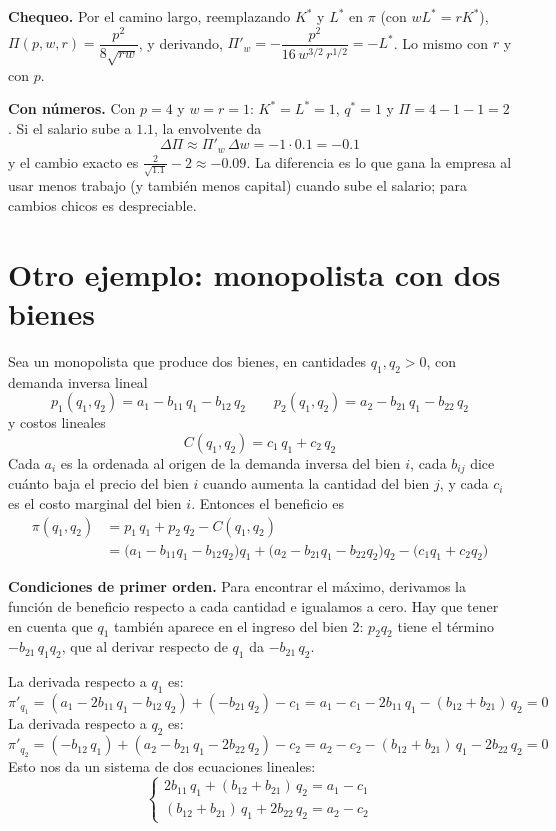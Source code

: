 \documentclass{article}
\begin{document}
\textbf{Chequeo.} Por el camino largo, reemplazando \(K^*\) y \(L^*\) en \(\pi\) (con \(wL^*=rK^*\)), \(\Pi(p,w,r)=\dfrac{p^2}{8\sqrt{rw}}\), y derivando, \(\Pi'_w=-\dfrac{p^2}{16\,w^{3/2}\,r^{1/2}}=-L^*\). Lo mismo con \(r\) y con \(p\).

\textbf{Con números.} Con \(p=4\) y \(w=r=1\): \(K^*=L^*=1\), \(q^*=1\) y \(\Pi=4-1-1=2\). Si el salario sube a \(1.1\), la envolvente da
\[
\Delta\Pi\approx\Pi'_w\,\Delta w=-1\cdot0.1=-0.1
\]
y el cambio exacto es \(\tfrac{2}{\sqrt{1.1}}-2\approx-0.09\). La diferencia es lo que gana la empresa al usar menos trabajo (y también menos capital) cuando sube el salario; para cambios chicos es despreciable.

\section*{Otro ejemplo: monopolista con dos bienes}

Sea un monopolista que produce dos bienes, en cantidades \(q_1,q_2>0\), con demanda inversa lineal
\[
p_1(q_1,q_2)=a_1-b_{11}\,q_1-b_{12}\,q_2
\qquad
p_2(q_1,q_2)=a_2-b_{21}\,q_1-b_{22}\,q_2
\]
y costos lineales
\[
C(q_1,q_2)=c_1\,q_1+c_2\,q_2
\]
Cada \(a_i\) es la ordenada al origen de la demanda inversa del bien \(i\), cada \(b_{ij}\) dice cuánto baja el precio del bien \(i\) cuando aumenta la cantidad del bien \(j\), y cada \(c_i\) es el costo marginal del bien \(i\). Entonces el beneficio es
\[
\begin{aligned}
\pi(q_1,q_2)
&= p_1\,q_1+p_2\,q_2-C(q_1,q_2)\\
&= \bigl(a_1-b_{11}q_1-b_{12}q_2\bigr)q_1
+\bigl(a_2-b_{21}q_1-b_{22}q_2\bigr)q_2
-\bigl(c_1q_1+c_2q_2\bigr)
\end{aligned}
\]

\textbf{Condiciones de primer orden.} Para encontrar el máximo, derivamos la función de beneficio respecto a cada cantidad e igualamos a cero. Hay que tener en cuenta que \(q_1\) también aparece en el ingreso del bien 2: \(p_2q_2\) tiene el término \(-b_{21}\,q_1q_2\), que al derivar respecto de \(q_1\) da \(-b_{21}\,q_2\).

La derivada respecto a \(q_1\) es:
\[
\pi'_{q_1}
=(a_1-2b_{11}\,q_1-b_{12}\,q_2)+(-b_{21}\,q_2)-c_1
=a_1-c_1-2b_{11}\,q_1-(b_{12}+b_{21})\,q_2=0
\]
La derivada respecto a \(q_2\) es:
\[
\pi'_{q_2}
=(-b_{12}\,q_1)+(a_2-b_{21}\,q_1-2b_{22}\,q_2)-c_2
=a_2-c_2-(b_{12}+b_{21})\,q_1-2b_{22}\,q_2=0
\]
Esto nos da un sistema de dos ecuaciones lineales:
\[
\begin{cases}
2b_{11}\,q_1+(b_{12}+b_{21})\,q_2=a_1-c_1\\
(b_{12}+b_{21})\,q_1+2b_{22}\,q_2=a_2-c_2
\end{cases}
\]
\end{document}

